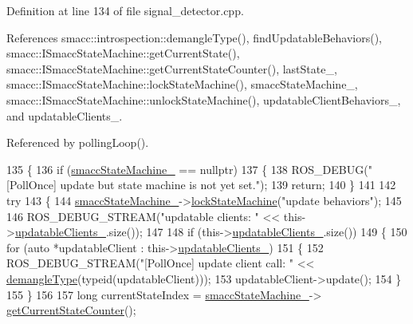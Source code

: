 Definition at line 134 of file signal\+\_\+detector.\+cpp.



References smacc\+::introspection\+::demangle\+Type(), find\+Updatable\+Behaviors(), smacc\+::\+I\+Smacc\+State\+Machine\+::get\+Current\+State(), smacc\+::\+I\+Smacc\+State\+Machine\+::get\+Current\+State\+Counter(), last\+State\+\_\+, smacc\+::\+I\+Smacc\+State\+Machine\+::lock\+State\+Machine(), smacc\+State\+Machine\+\_\+, smacc\+::\+I\+Smacc\+State\+Machine\+::unlock\+State\+Machine(), updatable\+Client\+Behaviors\+\_\+, and updatable\+Clients\+\_\+.



Referenced by polling\+Loop().


\begin{DoxyCode}
135 \{
136     \textcolor{keywordflow}{if} (\hyperlink{classsmacc_1_1SignalDetector_a46025de6ac7b5980e22144f9703236a4}{smaccStateMachine\_} == \textcolor{keyword}{nullptr})
137     \{
138         ROS\_DEBUG(\textcolor{stringliteral}{"[PollOnce] update but state machine is not yet set."});
139         \textcolor{keywordflow}{return};
140     \}
141 
142     \textcolor{keywordflow}{try}
143     \{
144         \hyperlink{classsmacc_1_1SignalDetector_a46025de6ac7b5980e22144f9703236a4}{smaccStateMachine\_}->\hyperlink{classsmacc_1_1ISmaccStateMachine_a5c8d4c9a4b11c7950266a00e48080ce3}{lockStateMachine}(\textcolor{stringliteral}{"update behaviors"});
145 
146         ROS\_DEBUG\_STREAM(\textcolor{stringliteral}{"updatable clients: "} << this->\hyperlink{classsmacc_1_1SignalDetector_a01a457b4ec935473d6426efb7b87e683}{updatableClients\_}.size());
147 
148         \textcolor{keywordflow}{if} (this->\hyperlink{classsmacc_1_1SignalDetector_a01a457b4ec935473d6426efb7b87e683}{updatableClients\_}.size())
149         \{
150             \textcolor{keywordflow}{for} (\textcolor{keyword}{auto} *updatableClient : this->\hyperlink{classsmacc_1_1SignalDetector_a01a457b4ec935473d6426efb7b87e683}{updatableClients\_})
151             \{
152                 ROS\_DEBUG\_STREAM(\textcolor{stringliteral}{"[PollOnce] update client call:  "} << 
      \hyperlink{namespacesmacc_1_1introspection_a670e39ccea29952859df4e2d0e45077b}{demangleType}(\textcolor{keyword}{typeid}(updatableClient)));
153                 updatableClient->update();
154             \}
155         \}
156 
157         \textcolor{keywordtype}{long} currentStateIndex = \hyperlink{classsmacc_1_1SignalDetector_a46025de6ac7b5980e22144f9703236a4}{smaccStateMachine\_}->
      \hyperlink{classsmacc_1_1ISmaccStateMachine_a03966e531cefc1e096bffa46111871d2}{getCurrentStateCounter}();

\end{DoxyCode}
